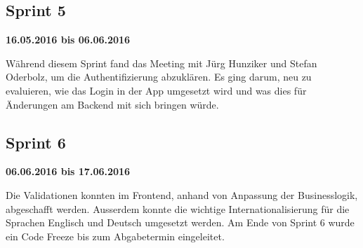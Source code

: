 \subsection{Sprint 5}
\textbf{16.05.2016 bis 06.06.2016}

Während diesem Sprint fand das Meeting mit Jürg Hunziker und Stefan Oderbolz, um die Authentifizierung abzuklären. 
Es ging darum, neu zu evaluieren, wie das Login in der App umgesetzt wird und was dies für Änderungen am Backend mit sich bringen würde. 

\subsection{Sprint 6}
\textbf{06.06.2016 bis 17.06.2016}

Die Validationen konnten im Frontend, anhand von Anpassung der Businesslogik, abgeschafft werden.
Ausserdem konnte die wichtige Internationalisierung für die Sprachen Englisch und Deutsch umgesetzt werden. 
Am Ende von Sprint 6 wurde ein Code Freeze bis zum Abgabetermin eingeleitet.
